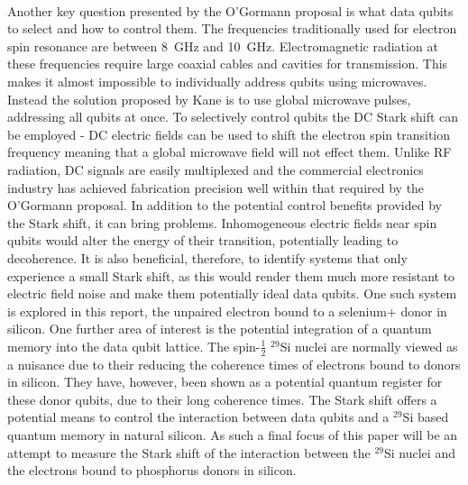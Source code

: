 \\
Another key question presented by the O'Gormann proposal is what data qubits to select and how to control them.
The frequencies traditionally used for electron spin resonance are between 8~GHz and 10~GHz. 
Electromagnetic radiation at these frequencies require large coaxial cables and cavities for transmission. 
This makes it almost impossible to individually address qubits using microwaves. 
Instead the solution proposed by Kane is to use global microwave pulses, addressing all qubits at once.
To selectively control qubits the DC Stark shift can be employed - DC electric fields can be used to shift the electron spin transition frequency meaning that a global microwave field will not effect them. 
Unlike RF radiation, DC signals are easily multiplexed and the commercial electronics industry has achieved fabrication precision well within that required by the O'Gormann proposal.
In addition to the potential control benefits provided by the Stark shift, it can bring problems. 
Inhomogeneous electric fields near spin qubits would alter the energy of their transition, potentially leading to decoherence.
It is also beneficial, therefore, to identify systems that only experience a small Stark shift, as this would render them much more resistant to electric field noise and make them potentially ideal data qubits.
One such system is explored in this report, the unpaired electron bound to a selenium$+$ donor in silicon.
One further area of interest is the potential integration of a quantum memory into the data qubit lattice.
The spin-$\frac{1}{2}$ $^{29}$Si nuclei are normally viewed as a nuisance due to their reducing the coherence times of electrons bound to donors in silicon.
They have, however, been shown as a potential quantum register for these donor qubits, due to their long coherence times.
The Stark shift offers a potential means to control the interaction between data qubits and a $^{29}$Si based quantum memory in natural silicon.
As such a final focus of this paper will be an attempt to measure the Stark shift of the interaction between the $^{29}$Si nuclei and the electrons bound to phosphorus donors in silicon.





